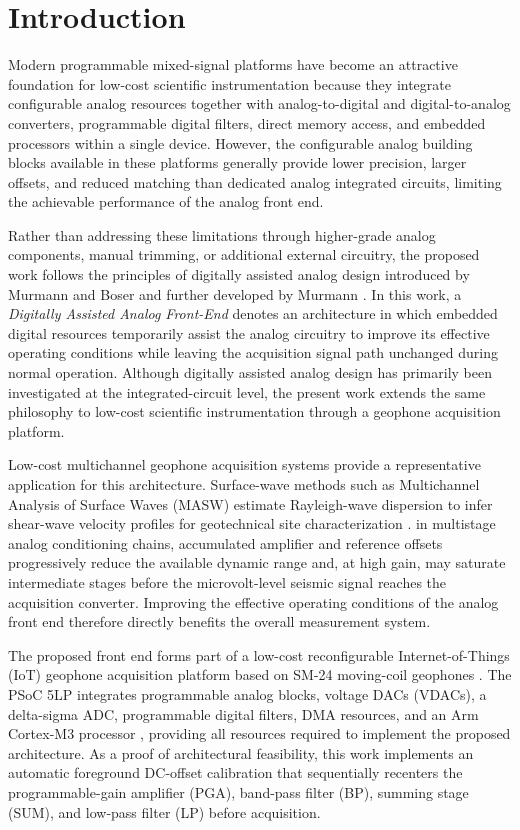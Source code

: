 \section{Introduction}

Modern programmable mixed-signal platforms have become an attractive foundation for low-cost scientific instrumentation because they integrate configurable analog resources together with analog-to-digital and digital-to-analog converters, programmable digital filters, direct memory access, and embedded processors within a single device. However, the configurable analog building blocks available in these platforms generally provide lower precision, larger offsets, and reduced matching than dedicated analog integrated circuits, limiting the achievable performance of the analog front end.

Rather than addressing these limitations through higher-grade analog components, manual trimming, or additional external circuitry, the proposed work follows the principles of digitally assisted analog design introduced by Murmann and Boser \cite{Murmann2004} and further developed by Murmann \cite{Murmann2006}. In this work, a \emph{Digitally Assisted Analog Front-End} denotes an architecture in which embedded digital resources temporarily assist the analog circuitry to improve its effective operating conditions while leaving the acquisition signal path unchanged during normal operation. Although digitally assisted analog design has primarily been investigated at the integrated-circuit level, the present work extends the same philosophy to low-cost scientific instrumentation through a geophone acquisition platform.

Low-cost multichannel geophone acquisition systems provide a representative application for this architecture. Surface-wave methods such as Multichannel Analysis of Surface Waves (MASW) estimate Rayleigh-wave dispersion to infer shear-wave velocity profiles for geotechnical site characterization \cite{Park1999,Foti2014}.  in multistage analog conditioning chains, accumulated amplifier and reference offsets progressively reduce the available dynamic range and, at high gain, may saturate intermediate stages before the microvolt-level seismic signal reaches the acquisition converter. Improving the effective operating conditions of the analog front end therefore directly benefits the overall measurement system.

The proposed front end forms part of a low-cost reconfigurable Internet-of-Things (IoT) geophone acquisition platform \cite{Guevara2015} based on SM-24 moving-coil geophones \cite{SM24}. The PSoC 5LP integrates programmable analog blocks, voltage DACs (VDACs), a delta-sigma ADC, programmable digital filters, DMA resources, and an Arm Cortex-M3 processor \cite{InfineonPSoC}, providing all resources required to implement the proposed architecture. As a proof of architectural feasibility, this work implements an automatic foreground DC-offset calibration that sequentially recenters the programmable-gain amplifier (PGA), band-pass filter (BP), summing stage (SUM), and low-pass filter (LP) before acquisition.

